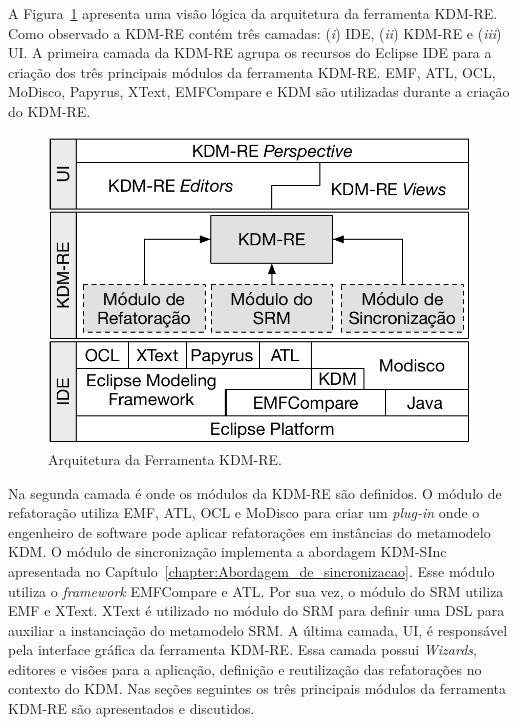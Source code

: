 A Figura~\ref{fig:arquitetura_ferramenta_kdm_re} apresenta uma visão lógica da arquitetura da ferramenta KDM-RE. Como observado a KDM-RE contém três camadas: (\textit{i}) IDE, (\textit{ii}) KDM-RE e (\textit{iii}) UI. A primeira camada da KDM-RE agrupa os recursos do Eclipse IDE para a criação dos três principais módulos da ferramenta KDM-RE. EMF, ATL, OCL, MoDisco, Papyrus, XText, EMFCompare e KDM são utilizadas durante a criação do KDM-RE.

\begin{figure}[h]
	\centering
	\caption{Arquitetura da Ferramenta KDM-RE.}
	\label{fig:arquitetura_ferramenta_kdm_re}
	\includegraphics[scale=0.75]{images/arquitetura_KDM-RE}
	\fautor
\end{figure}

Na segunda camada é onde os módulos da KDM-RE são definidos. O módulo de refatoração utiliza EMF, ATL, OCL e MoDisco para criar um \textit{plug-in} onde o engenheiro de software pode aplicar refatorações em instâncias do metamodelo KDM. O módulo de sincronização implementa a abordagem KDM-SInc apresentada no Capítulo~\ref{chapter:Abordagem_de_sincronizacao}. Esse módulo utiliza o \textit{framework} EMFCompare e ATL. Por sua vez, o módulo do SRM utiliza EMF e XText. XText é utilizado no módulo do SRM para definir uma DSL para auxiliar a instanciação do metamodelo SRM. A última camada, UI, é responsável pela interface gráfica da ferramenta KDM-RE. Essa camada possui \textit{Wizards}, editores e visões para a aplicação, definição e reutilização das refatorações no contexto do KDM. Nas seções seguintes os três principais módulos da ferramenta KDM-RE são apresentados e discutidos.



